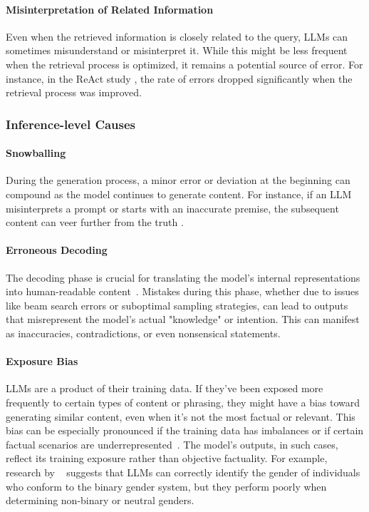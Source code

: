 \paragraph{Misinterpretation of Related Information}
Even when the retrieved information is closely related to the query, LLMs can sometimes misunderstand or misinterpret it. While this might be less frequent when the retrieval process is optimized, it remains a potential source of error. For instance, in the ReAct study \citep{yao2023react}, the rate of errors dropped significantly when the retrieval process was improved.

\subsubsection{Inference-level Causes}
\label{sec:inference-causes}
\paragraph{Snowballing} During the generation process, a minor error or deviation at the beginning can compound as the model continues to generate content. %
For instance, if an LLM misinterprets a prompt or starts with an inaccurate premise, the subsequent content can veer further from the truth \citep{Snowball,varshney2023stitch}.

\paragraph{Erroneous Decoding} The decoding phase is crucial for translating the model's internal representations into human-readable content~\citep{chuang2023dola, massarelli2020decoding}. Mistakes during this phase, whether due to issues like beam search errors or suboptimal sampling strategies, can lead to outputs that misrepresent the model's actual "knowledge" or intention. This can manifest as inaccuracies, contradictions, or even nonsensical statements.

\paragraph{Exposure Bias}
LLMs are a product of their training data. If they've been exposed more frequently to certain types of content or phrasing, they might have a bias toward generating similar content, even when it's not the most factual or relevant. This bias can be especially pronounced if the training data has imbalances or if certain factual scenarios are underrepresented~\citep{felkner2023winoqueer, gallegos2023bias}. The model's outputs, in such cases, reflect its training exposure rather than objective factuality. For example, research by ~\cite{hossain-etal-2023-misgendered} suggests that LLMs can correctly identify the gender of individuals who conform to the binary gender system, but they perform poorly when determining non-binary or neutral genders.